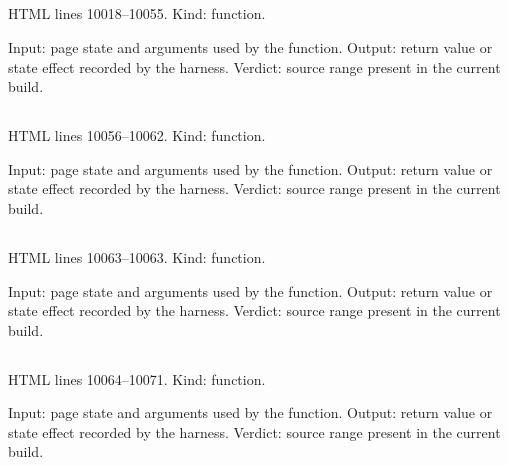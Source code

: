 \subsection*{\texttt{}}
\label{vf_551_renderReviewInstrument}
HTML lines 10018--10055. Kind: function.

Input: page state and arguments used by the function.
Output: return value or state effect recorded by the harness.
Verdict: source range present in the current build.

\subsection*{\texttt{}}
\label{vf_552_instrumentZip}
HTML lines 10056--10062. Kind: function.

Input: page state and arguments used by the function.
Output: return value or state effect recorded by the harness.
Verdict: source range present in the current build.

\subsection*{\texttt{}}
\label{vf_553_downloadCurveCSV}
HTML lines 10063--10063. Kind: function.

Input: page state and arguments used by the function.
Output: return value or state effect recorded by the harness.
Verdict: source range present in the current build.

\subsection*{\texttt{}}
\label{vf_554_downloadCurveCSVCore}
HTML lines 10064--10071. Kind: function.

Input: page state and arguments used by the function.
Output: return value or state effect recorded by the harness.
Verdict: source range present in the current build.

